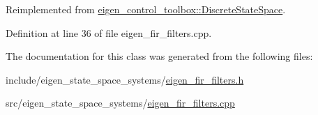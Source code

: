 Reimplemented from \hyperlink{classeigen__control__toolbox_1_1_discrete_state_space_ae58e06527268253cea809554a528fdfe}{eigen\+\_\+control\+\_\+toolbox\+::\+Discrete\+State\+Space}.



Definition at line 36 of file eigen\+\_\+fir\+\_\+filters.\+cpp.



The documentation for this class was generated from the following files\+:\begin{DoxyCompactItemize}
\item 
include/eigen\+\_\+state\+\_\+space\+\_\+systems/\hyperlink{eigen__fir__filters_8h}{eigen\+\_\+fir\+\_\+filters.\+h}\item 
src/eigen\+\_\+state\+\_\+space\+\_\+systems/\hyperlink{eigen__fir__filters_8cpp}{eigen\+\_\+fir\+\_\+filters.\+cpp}\end{DoxyCompactItemize}
